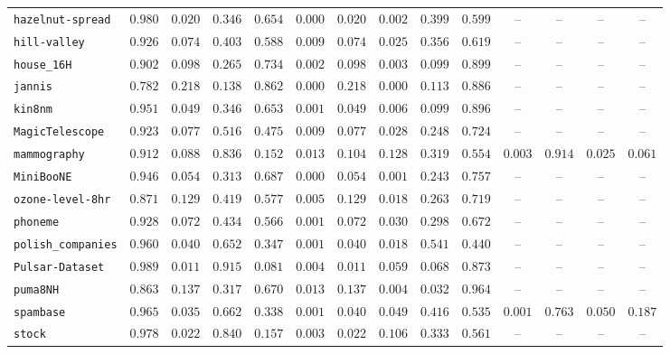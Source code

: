 {\begin{tabular}{@{}lccccccccccccc@{}}
\texttt{hazelnut-spread} & $0.980$ & $0.020$ & $0.346$ & $0.654$ & $0.000$ & $0.020$ & $0.002$ & $0.399$ & $0.599$ & -- & -- & -- & -- \\
\texttt{hill-valley} & $0.926$ & $0.074$ & $0.403$ & $0.588$ & $0.009$ & $0.074$ & $0.025$ & $0.356$ & $0.619$ & -- & -- & -- & -- \\
\texttt{house\_16H} & $0.902$ & $0.098$ & $0.265$ & $0.734$ & $0.002$ & $0.098$ & $0.003$ & $0.099$ & $0.899$ & -- & -- & -- & -- \\
\texttt{jannis} & $0.782$ & $0.218$ & $0.138$ & $0.862$ & $0.000$ & $0.218$ & $0.000$ & $0.113$ & $0.886$ & -- & -- & -- & -- \\
\texttt{kin8nm} & $0.951$ & $0.049$ & $0.346$ & $0.653$ & $0.001$ & $0.049$ & $0.006$ & $0.099$ & $0.896$ & -- & -- & -- & -- \\
\texttt{MagicTelescope} & $0.923$ & $0.077$ & $0.516$ & $0.475$ & $0.009$ & $0.077$ & $0.028$ & $0.248$ & $0.724$ & -- & -- & -- & -- \\
\texttt{mammography} & $0.912$ & $0.088$ & $0.836$ & $0.152$ & $0.013$ & $0.104$ & $0.128$ & $0.319$ & $0.554$ & $0.003$ & $0.914$ & $0.025$ & $0.061$ \\
\texttt{MiniBooNE} & $0.946$ & $0.054$ & $0.313$ & $0.687$ & $0.000$ & $0.054$ & $0.001$ & $0.243$ & $0.757$ & -- & -- & -- & -- \\
\texttt{ozone-level-8hr} & $0.871$ & $0.129$ & $0.419$ & $0.577$ & $0.005$ & $0.129$ & $0.018$ & $0.263$ & $0.719$ & -- & -- & -- & -- \\
\texttt{phoneme} & $0.928$ & $0.072$ & $0.434$ & $0.566$ & $0.001$ & $0.072$ & $0.030$ & $0.298$ & $0.672$ & -- & -- & -- & -- \\
\texttt{polish\_companies} & $0.960$ & $0.040$ & $0.652$ & $0.347$ & $0.001$ & $0.040$ & $0.018$ & $0.541$ & $0.440$ & -- & -- & -- & -- \\
\texttt{Pulsar-Dataset} & $0.989$ & $0.011$ & $0.915$ & $0.081$ & $0.004$ & $0.011$ & $0.059$ & $0.068$ & $0.873$ & -- & -- & -- & -- \\
\texttt{puma8NH} & $0.863$ & $0.137$ & $0.317$ & $0.670$ & $0.013$ & $0.137$ & $0.004$ & $0.032$ & $0.964$ & -- & -- & -- & -- \\
\texttt{spambase} & $0.965$ & $0.035$ & $0.662$ & $0.338$ & $0.001$ & $0.040$ & $0.049$ & $0.416$ & $0.535$ & $0.001$ & $0.763$ & $0.050$ & $0.187$ \\
\texttt{stock} & $0.978$ & $0.022$ & $0.840$ & $0.157$ & $0.003$ & $0.022$ & $0.106$ & $0.333$ & $0.561$ & -- & -- & -- & -- \\

\end{tabular}}
